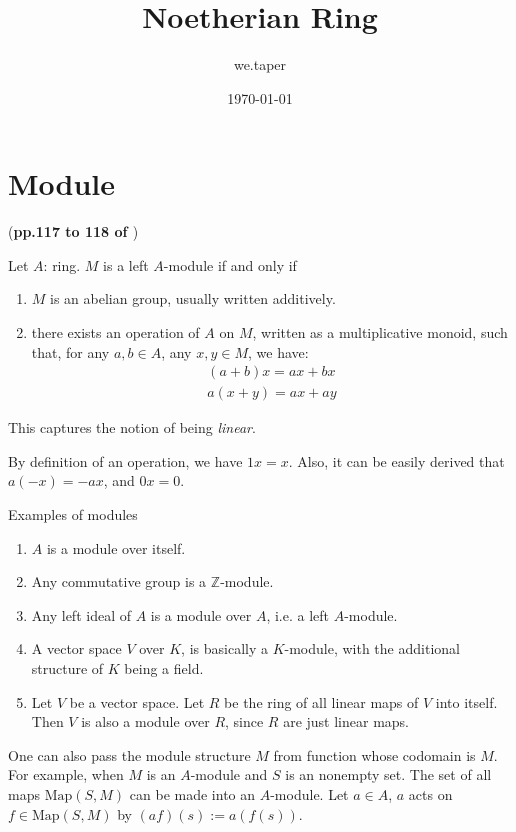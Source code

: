 \documentclass{article}
\title{Noetherian Ring}
\date{\today}
\author{we.taper}
\begin{document}
\maketitle
{}
\tableofcontents

\section{Module}
\label{sec:Module}
(\textbf{pp.117 to 118 of \cite{lang}})
\begin{defi}[Module]
Let $A$: ring. $M$ is a left $A$-module if and only if 
\begin{enumerate}
    \item $M$ is an abelian group, usually written additively.
    \item there exists an operation of $A$ on $M$, written as a
        multiplicative monoid, such that, for any $a,b\in A$, any
        $x,y \in M$, we have:
        \begin{align}
            (a+b) x = ax + bx\\
            a(x+y) = ax + ay
        \end{align}
\end{enumerate}
    This captures the notion of being \textit{linear}.
\end{defi}

By definition of an operation, we have $1x = x$. Also, it can be easily
derived that $a(-x) = -ax$, and $0x=0$.

\begin{ex}{Examples of modules}
    \begin{enumerate}
        \item $A$ is a module over itself.
        \item Any commutative group is a $\mathbb{Z}$-module.
        \item Any left ideal of $A$ is a module over $A$, i.e. a left
            $A$-module.
        \item A vector space $V$ over $K$, is basically a $K$-module,
            with the additional structure of $K$ being a field.
        \item Let $V$ be a vector space. 
            Let $R$ be the ring of all linear maps of $V$ into itself.
            Then $V$ is also a module over $R$, since $R$ are just
            linear maps.
    \end{enumerate}
\end{ex}
\begin{ex}
    One can also pass the module structure $M$ from function whose
    codomain is $M$. For example, when $M$ is an $A$-module and $S$ is
    an nonempty set. The set of all maps $\mathrm{Map}(S,M)$ can be
    made into an $A$-module. Let $a\in A$, $a$ acts on 
    $f\in \mathrm{Map}(S,M)$ by $(af)(s) := a(f(s))$.
\end{ex}
\end{document}
